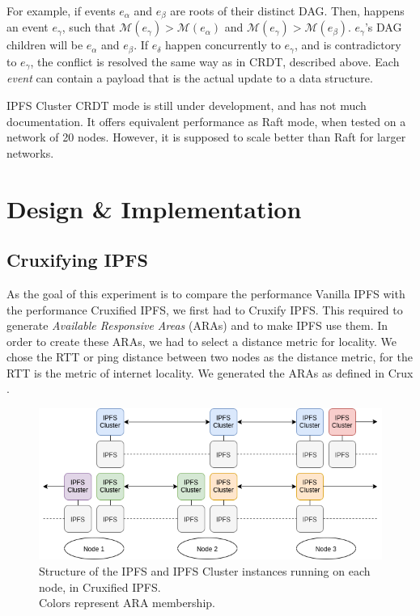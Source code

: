 \documentclass[a4paper,11pt,oneside]{report}
\begin{document}
For example, if events $e_\alpha$ and $e_\beta$ are roots of their distinct DAG. Then, happens an event $e_\gamma$, such that $\mathcal{M}(e_\gamma) > \mathcal{M}(e_\alpha)$ and $\mathcal{M}(e_\gamma) > \mathcal{M}(e_\beta)$. $e_\gamma$'s DAG children will be  $e_\alpha$ and $e_\beta$. If $e_\delta$ happen concurrently to $e_\gamma$, and is contradictory to $e_\gamma$, the conflict is resolved the same way as in CRDT, described above. Each \textit{event} can contain a payload that is the actual update to a data structure.

IPFS Cluster CRDT mode is still under development, and has not much documentation. It offers equivalent performance as Raft mode, when tested on a network of 20 nodes. However, it is supposed to scale better than Raft for larger networks.

\chapter{Design \& Implementation}

\section{Cruxifying IPFS}
As the goal of this experiment is to compare the performance Vanilla IPFS with the performance Cruxified IPFS, we first had to Cruxify IPFS. This required to generate \textit{Available Responsive Areas} (ARAs) and to make IPFS use them. In order to create these ARAs, we had to select a distance metric for locality. We chose the RTT or ping distance between two nodes as the distance metric, for the RTT is the metric of internet locality. We generated the ARAs as defined in Crux \cite{crux}.

\vspace{0.8cm}

\begin{figure}[ht!]
  \centering
  \captionsetup{width=.6\linewidth}
  \captionsetup{justification=centering}
  \includegraphics[width=.8\linewidth]{diagram.png}
  \caption{Structure of the IPFS and IPFS Cluster instances running on each node, in Cruxified IPFS.\\ Colors represent ARA membership.}
  \label{fig:diagram}
\end{figure}
\end{document}
